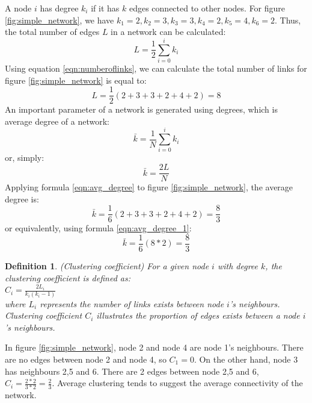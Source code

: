 \documentclass[12pt]{article}
\newtheorem{definition}{Definition}[section]
\begin{document}
\par
A node $i$ has degree $k_i$ if it has $k$ edges connected to other nodes. For figure \ref{fig:simple_network}, we have $k_1=2,k_2=3,k_3=3,k_4=2,k_5=4,k_6=2$. Thus, the total number of edges $L$ in a network can be calculated:
\begin{equation}
    L = \frac{1}{2}\sum^{i}_{i=0}{k_i}
    \label{eqn:numberoflinks}
\end{equation}
Using equation \ref{eqn:numberoflinks}, we can calculate the total number of links for figure \ref{fig:simple_network} is equal to:\\
\begin{equation}
    L =\frac{1}{2}(2+3+3+2+4+2)=8
\end{equation}
An important parameter of a network is generated using degrees, which is average degree of a network:
\begin{equation}
    \bar{k}=\frac{1}{N} \sum^{i}_{i=0}{k_i}
    \label{eqn:avg_degree}
\end{equation}
or, simply:
\begin{equation}
    \bar{k}=\frac{2L}{N}
    \label{eqn:avg_degree_1}
\end{equation}
Applying formula \ref{eqn:avg_degree} to figure \ref{fig:simple_network}, the average degree is:
\begin{equation}
    \bar{k} = \frac{1}{6}(2+3+3+2+4+2)=\frac{8}{3}
\end{equation}
or equivalently, using formula \ref{eqn:avg_degree_1}:
\begin{equation}
    \bar{k} = \frac{1}{6}(8*2)=\frac{8}{3}
\end{equation}
\begin{definition}{(Clustering coefficient)}
For a given node $i$ with degree $k$, the clustering coefficient is defined as:\\
    $C_i=\frac{2L_i}{k_i(k_i-1)}$\\
    where $L_i$ represents the number of links exists between node $i$'s neighbours.\\
    Clustering coefficient $C_i$ illustrates the proportion of edges exists between a node $i$'s neighbours. 
\end{definition}
\par 
In figure \ref{fig:simple_network}, node 2 and node 4 are node 1's neighbours. There are no edges between node 2 and node 4, so $C_1 = 0$. On the other hand, node 3 has neighbours 2,5 and 6. There are 2 edges between node 2,5 and 6, $C_i=\frac{2*2}{3*2}=\frac{2}{3}$. Average clustering tends to suggest the average connectivity of the network.
\end{document}
